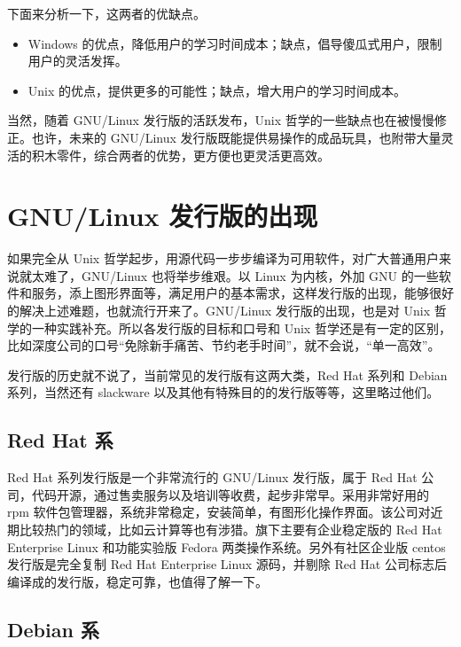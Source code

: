 \documentclass[doctor,openright,twoside]{sjtuthesis}
\providecommand{\tightlist}{%
    \setlength{\itemsep}{0pt}\setlength{\parskip}{0pt}}
\theoremstyle{plain}
\theoremstyle{definition}
\theoremstyle{remark}
\theoremstyle{ocrenumbox}
\theoremstyle{plain}
\newcommand\cqh{“}
\newcommand\cqt{”}
\begin{document}
下面来分析一下，这两者的优缺点。

\begin{itemize}
\tightlist
\item
  Windows
  的优点，降低用户的学习时间成本；缺点，倡导傻瓜式用户，限制用户的灵活发挥。
\item
  Unix 的优点，提供更多的可能性；缺点，增大用户的学习时间成本。
\end{itemize}

当然，随着 GNU/Linux 发行版的活跃发布，Unix
哲学的一些缺点也在被慢慢修正。也许，未来的 GNU/Linux
发行版既能提供易操作的成品玩具，也附带大量灵活的积木零件，综合两者的优势，更方便也更灵活更高效。

\hypertarget{chap:linux-intro:distro}{%
\section{GNU/Linux 发行版的出现}\label{chap:linux-intro:distro}}

如果完全从 Unix
哲学起步，用源代码一步步编译为可用软件，对广大普通用户来说就太难了，GNU/Linux
也将举步维艰。以 Linux 为内核，外加 GNU
的一些软件和服务，添上图形界面等，满足用户的基本需求，这样发行版的出现，能够很好的解决上述难题，也就流行开来了。GNU/Linux
发行版的出现，也是对 Unix 哲学的一种实践补充。所以各发行版的目标和口号和
Unix
哲学还是有一定的区别，比如深度公司的口号\cqh 免除新手痛苦、节约老手时间\cqt ，就不会说，\cqh 单一高效\cqt 。

发行版的历史就不说了，当前常见的发行版有这两大类，Red Hat 系列和 Debian
系列，当然还有 slackware 以及其他有特殊目的的发行版等等，这里略过他们。

\hypertarget{red-hat-}{%
\subsection{Red Hat 系}\label{red-hat-}}

Red Hat 系列发行版是一个非常流行的 GNU/Linux 发行版，属于 Red Hat
公司，代码开源，通过售卖服务以及培训等收费，起步非常早。采用非常好用的
rpm
软件包管理器，系统非常稳定，安装简单，有图形化操作界面。该公司对近期比较热门的领域，比如云计算等也有涉猎。旗下主要有企业稳定版的
Red Hat Enterprise Linux 和功能实验版 Fedora
两类操作系统。另外有社区企业版 centos 发行版是完全复制 Red Hat
Enterprise Linux 源码，并剔除 Red Hat
公司标志后编译成的发行版，稳定可靠，也值得了解一下。

\hypertarget{debian-}{%
\subsection{Debian 系}\label{debian-}}
\end{document}
